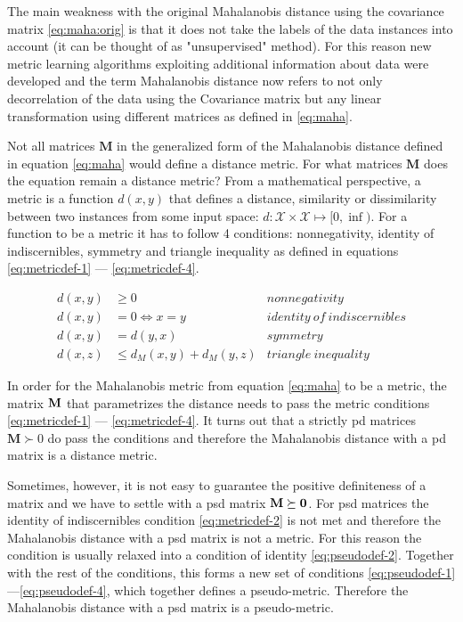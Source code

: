 \documentclass[12pt,a4paper]{report}
\begin{document}
The main weakness with the original Mahalanobis distance using the covariance matrix \ref{eq:maha:orig} is that it does not take the labels of the data instances into account (it can be thought of as "unsupervised" method). For this reason new metric learning algorithms exploiting additional information about data were developed and the term Mahalanobis distance now refers to not only decorrelation of the data using the Covariance matrix but any linear transformation using different matrices as defined in \ref{eq:maha}.

Not all matrices $\bm{M}$ in the generalized form of the Mahalanobis distance defined in equation \ref{eq:maha} would define a distance metric. For what matrices $\bm{M}$ does the equation remain a distance metric? From a mathematical perspective, a metric is a function $d(x,y)$ that defines a distance, similarity or dissimilarity between two instances from some input space: $d:\mathcal{X} \times \mathcal{X} \mapsto [0,\inf)$. For a function to be a metric it has to follow 4 conditions: nonnegativity, identity of indiscernibles, symmetry and triangle inequality as defined in equations \ref{eq:metricdef-1} --- \ref{eq:metricdef-4}.

\begin{align}
d(x,y) &\geq 0 & nonnegativity \label{eq:metricdef-1} \\
d(x,y) &= 0 \iff x=y & identity \ of \ indiscernibles \label{eq:metricdef-2} \\
d(x,y) &= d(y,x) & symmetry \label{eq:metricdef-3} \\
d(x,z) &\leq d_M(x,y) + d_M(y,z) & triangle \ inequality \label{eq:metricdef-4}
\end{align} 

In order for the Mahalanobis metric from equation \eqref{eq:maha} to be a metric, the matrix $\bf{M}$ that parametrizes the distance needs to pass the metric conditions \ref{eq:metricdef-1} --- \ref{eq:metricdef-4}. It turns out that a strictly \ac{pd} matrices $\bm{M} \succ 0$ do pass the conditions and therefore the Mahalanobis distance with a \ac{pd} matrix is a distance metric.

Sometimes, however, it is not easy to guarantee the positive definiteness of a matrix and we have to settle with a \ac{psd} matrix $\bf{M} \succeq 0$. For \ac{psd} matrices the identity of indiscernibles condition \ref{eq:metricdef-2} is not met and therefore the Mahalanobis distance with a \ac{psd} matrix is not a metric. For this reason the condition is usually relaxed into a condition of identity \ref{eq:pseudodef-2}. Together with the rest of the conditions, this forms a new set of conditions \ref{eq:pseudodef-1} ---\ref{eq:pseudodef-4}, which together defines a pseudo-metric. Therefore the Mahalanobis distance with a \ac{psd} matrix is a pseudo-metric.
\end{document}
